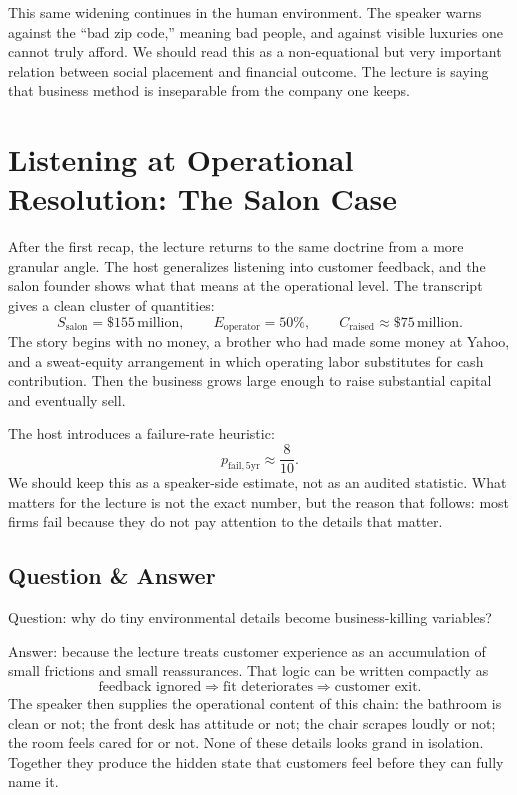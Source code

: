 This same widening continues in the human environment. The speaker warns against the ``bad zip code,'' meaning bad people, and against visible luxuries one cannot truly afford. We should read this as a non-equational but very important relation between social placement and financial outcome. The lecture is saying that business method is inseparable from the company one keeps.

\section{Listening at Operational Resolution: The Salon Case}

After the first recap, the lecture returns to the same doctrine from a more granular angle. The host generalizes listening into customer feedback, and the salon founder shows what that means at the operational level. The transcript gives a clean cluster of quantities:
\begin{equation}
S_{\text{salon}} = \$155\,\text{million}, \qquad E_{\text{operator}} = 50\%, \qquad C_{\text{raised}} \approx \$75\,\text{million}.
\end{equation}
The story begins with no money, a brother who had made some money at Yahoo, and a sweat-equity arrangement in which operating labor substitutes for cash contribution. Then the business grows large enough to raise substantial capital and eventually sell.

The host introduces a failure-rate heuristic:
\begin{equation}
p_{\text{fail},5\text{yr}} \approx \frac{8}{10}.
\end{equation}
We should keep this as a speaker-side estimate, not as an audited statistic. What matters for the lecture is not the exact number, but the reason that follows: most firms fail because they do not pay attention to the details that matter.

\subsection{Question \& Answer}

Question: why do tiny environmental details become business-killing variables?

Answer: because the lecture treats customer experience as an accumulation of small frictions and small reassurances. That logic can be written compactly as
\begin{equation}
\text{feedback ignored} \Rightarrow \text{fit deteriorates} \Rightarrow \text{customer exit}.
\end{equation}
The speaker then supplies the operational content of this chain: the bathroom is clean or not; the front desk has attitude or not; the chair scrapes loudly or not; the room feels cared for or not. None of these details looks grand in isolation. Together they produce the hidden state that customers feel before they can fully name it.

